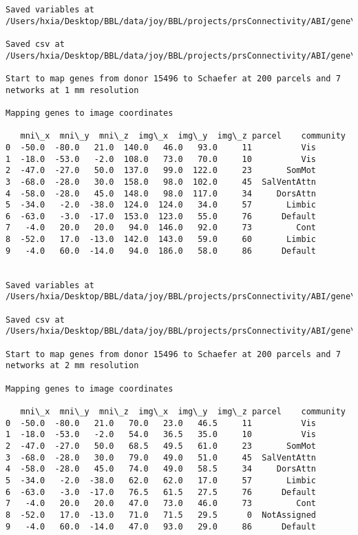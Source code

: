 \documentclass[11pt]{article}
\begin{document}
\begin{Verbatim}[commandchars=\\\{\}]
Saved variables at /Users/hxia/Desktop/BBL/data/joy/BBL/projects/prsConnectivity/ABI/gene\_mapping/15496donor\_100Parcels\_17Network\_2mm.pkl

Saved csv at /Users/hxia/Desktop/BBL/data/joy/BBL/projects/prsConnectivity/ABI/gene\_mapping/15496donor\_100Parcels\_17Network\_2mm.csv

Start to map genes from donor 15496 to Schaefer at 200 parcels and 7 networks at 1 mm resolution

Mapping genes to image coordinates

   mni\_x  mni\_y  mni\_z  img\_x  img\_y  img\_z parcel    community
0  -50.0  -80.0   21.0  140.0   46.0   93.0     11          Vis
1  -18.0  -53.0   -2.0  108.0   73.0   70.0     10          Vis
2  -47.0  -27.0   50.0  137.0   99.0  122.0     23       SomMot
3  -68.0  -28.0   30.0  158.0   98.0  102.0     45  SalVentAttn
4  -58.0  -28.0   45.0  148.0   98.0  117.0     34     DorsAttn
5  -34.0   -2.0  -38.0  124.0  124.0   34.0     57       Limbic
6  -63.0   -3.0  -17.0  153.0  123.0   55.0     76      Default
7   -4.0   20.0   20.0   94.0  146.0   92.0     73         Cont
8  -52.0   17.0  -13.0  142.0  143.0   59.0     60       Limbic
9   -4.0   60.0  -14.0   94.0  186.0   58.0     86      Default


Saved variables at /Users/hxia/Desktop/BBL/data/joy/BBL/projects/prsConnectivity/ABI/gene\_mapping/15496donor\_200Parcels\_7Network\_1mm.pkl

Saved csv at /Users/hxia/Desktop/BBL/data/joy/BBL/projects/prsConnectivity/ABI/gene\_mapping/15496donor\_200Parcels\_7Network\_1mm.csv

Start to map genes from donor 15496 to Schaefer at 200 parcels and 7 networks at 2 mm resolution

Mapping genes to image coordinates

   mni\_x  mni\_y  mni\_z  img\_x  img\_y  img\_z parcel    community
0  -50.0  -80.0   21.0   70.0   23.0   46.5     11          Vis
1  -18.0  -53.0   -2.0   54.0   36.5   35.0     10          Vis
2  -47.0  -27.0   50.0   68.5   49.5   61.0     23       SomMot
3  -68.0  -28.0   30.0   79.0   49.0   51.0     45  SalVentAttn
4  -58.0  -28.0   45.0   74.0   49.0   58.5     34     DorsAttn
5  -34.0   -2.0  -38.0   62.0   62.0   17.0     57       Limbic
6  -63.0   -3.0  -17.0   76.5   61.5   27.5     76      Default
7   -4.0   20.0   20.0   47.0   73.0   46.0     73         Cont
8  -52.0   17.0  -13.0   71.0   71.5   29.5      0  NotAssigned
9   -4.0   60.0  -14.0   47.0   93.0   29.0     86      Default



\end{Verbatim}
\end{document}
